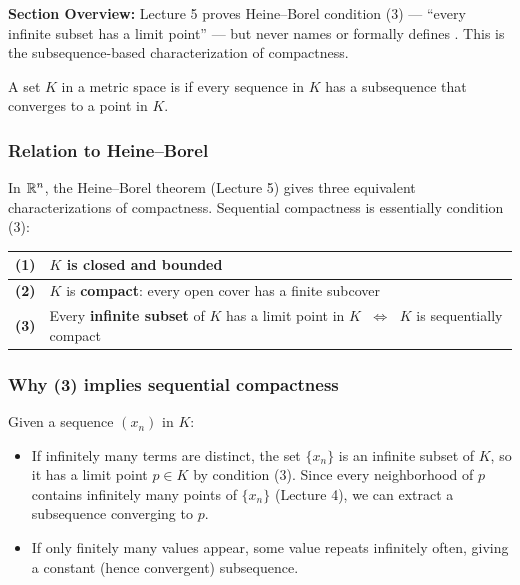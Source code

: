 \documentclass[../master/master.tex]{subfiles}
\begin{document}
\begin{summarybox}
\textbf{Section Overview:} Lecture 5 proves Heine--Borel condition (3) --- ``every infinite subset has a limit point'' --- but never names or formally defines . This is the subsequence-based characterization of compactness.
\end{summarybox}

\begin{definition}
A set $K$ in a metric space is  if every sequence in $K$ has a subsequence that converges to a point in $K$.
\end{definition}

\subsubsection*{Relation to Heine--Borel}

In $\mathbb{R}^n$, the Heine--Borel theorem (Lecture 5) gives three equivalent characterizations of compactness. Sequential compactness is essentially condition (3):

\begin{center}
\renewcommand{\arraystretch}{1.5}
\begin{tabular}{|c|p{9cm}|}
\hline
\textbf{(1)} & $K$ is \textbf{closed and bounded} \\
\hline
\textbf{(2)} & $K$ is \textbf{compact}: every open cover has a finite subcover \\
\hline
\textbf{(3)} & Every \textbf{infinite subset} of $K$ has a limit point in $K$ $\;\Longleftrightarrow\;$ $K$ is sequentially compact \\
\hline
\end{tabular}
\end{center}

\subsubsection*{Why (3) implies sequential compactness}

Given a sequence $(x_n)$ in $K$:
\begin{itemize}
    \item If infinitely many terms are distinct, the set $\{x_n\}$ is an infinite subset of $K$, so it has a limit point $p \in K$ by condition (3). Since every neighborhood of $p$ contains infinitely many points of $\{x_n\}$ (Lecture 4), we can extract a subsequence converging to $p$.
    \item If only finitely many values appear, some value repeats infinitely often, giving a constant (hence convergent) subsequence.
\end{itemize}
\end{document}
